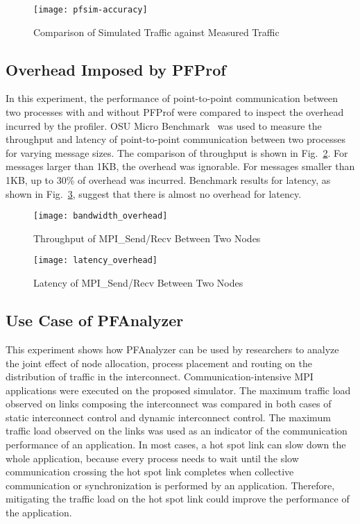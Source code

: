 \begin{figure}
    \centering
    \texttt{[image: pfsim-accuracy]}
    \caption{Comparison of Simulated Traffic against Measured Traffic}%
    \label{fig:pfsim-accuracy}
\end{figure}

\subsection{Overhead Imposed by PFProf}

In this experiment, the performance of point-to-point communication
between two processes with and without PFProf were compared to inspect
the overhead incurred by the profiler. OSU Micro
Benchmark~\autocite{omb} was used to measure the throughput and latency
of point-to-point communication between two processes for varying
message sizes. The comparison of throughput is shown in
Fig.~\ref{fig:bandwidth-overhead}. For messages larger than 1KB, the
overhead was ignorable. For messages smaller than 1KB, up to 30\% of
overhead was incurred. Benchmark results for latency, as shown in
Fig.~\ref{fig:latency-overhead}, suggest that there is almost no
overhead for latency.

\begin{figure}
    \centering
    \texttt{[image: bandwidth\_overhead]}
    \caption{Throughput of MPI\_Send/Recv Between Two Nodes}%
    \label{fig:bandwidth-overhead}
\end{figure}

\begin{figure}
    \centering
    \texttt{[image: latency\_overhead]}
    \caption{Latency of MPI\_Send/Recv Between Two Nodes}%
    \label{fig:latency-overhead}
\end{figure}

\subsection{Use Case of PFAnalyzer}\label{sec:ii-simulation-results}

This experiment shows how PFAnalyzer can be used by researchers to analyze the
joint effect of node allocation, process placement and routing on the
distribution of traffic in the interconnect. Communication-intensive MPI
applications were executed on the proposed simulator. The maximum traffic load
observed on links composing the interconnect was compared in both cases of
static interconnect control and dynamic interconnect control. The maximum
traffic load observed on the links was used as an indicator of the
communication performance of an application. In most cases, a hot spot link
can slow down the whole application, because every process needs to wait until
the slow communication crossing the hot spot link completes when collective
communication or synchronization is performed by an application. Therefore,
mitigating the traffic load on the hot spot link could improve the performance
of the application.

